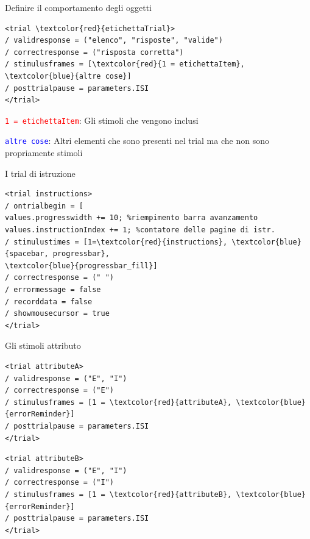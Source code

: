 \documentclass{beamer}
\begin{document}
\begin{frame}[fragile]{Definire il comportamento degli oggetti}
\begin{small}
	\begin{Verbatim}[commandchars=\\\{\}]
<trial \textcolor{red}{etichettaTrial}>
/ validresponse = ("elenco", "risposte", "valide")
/ correctresponse = ("risposta corretta")
/ stimulusframes = [\textcolor{red}{1 = etichettaItem}, \textcolor{blue}{altre cose}]
/ posttrialpause = parameters.ISI
</trial>
	\end{Verbatim}
\end{small}
 

\texttt{\textcolor{red}{1 = etichettaItem}}: Gli stimoli che vengono inclusi

\texttt{\textcolor{blue}{altre cose}}: Altri elementi che sono presenti nel trial ma che non sono propriamente stimoli 

\end{frame}

\begin{frame}[fragile]{I trial di istruzione}
	\begin{small}
	
	\begin{Verbatim}[commandchars=\\\{\}]
<trial instructions>
/ ontrialbegin = [
values.progresswidth += 10; %riempimento barra avanzamento 
values.instructionIndex += 1; %contatore delle pagine di istr.
/ stimulustimes = [1=\textcolor{red}{instructions}, \textcolor{blue}{spacebar, progressbar}, 
\textcolor{blue}{progressbar_fill}]
/ correctresponse = (" ")
/ errormessage = false
/ recorddata = false
/ showmousecursor = true
</trial>
	\end{Verbatim}

	\end{small}


\end{frame}



\begin{frame}[fragile]{	Gli stimoli attributo}
	\vspace{3mm}
\begin{Verbatim}[commandchars=\\\{\}]
<trial attributeA>
/ validresponse = ("E", "I")
/ correctresponse = ("E")
/ stimulusframes = [1 = \textcolor{red}{attributeA}, \textcolor{blue}{errorReminder}]
/ posttrialpause = parameters.ISI
</trial>
	\end{Verbatim}
	\vspace{3mm}
\begin{Verbatim}[commandchars=\\\{\}]
<trial attributeB>
/ validresponse = ("E", "I")
/ correctresponse = ("I")
/ stimulusframes = [1 = \textcolor{red}{attributeB}, \textcolor{blue}{errorReminder}]
/ posttrialpause = parameters.ISI
</trial>
\end{Verbatim}
\end{frame}
\end{document}
